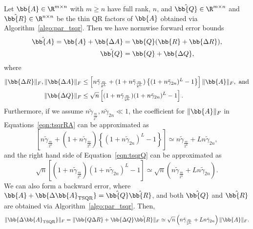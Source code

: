 \begin{theorem}
	\label{thm:moriTSQR}
	Let $\bb{A}\in\R^{m\times n}$ with $m\geq n$ have full rank, $n$, and $\hat{\bb{Q}}\in\R^{m\times n}$ and $\hat{\bb{R}}\in\R^{n\times n}$ be the thin QR factors of $\bb{A}$ obtained via Algorithm~\ref{algo:par_tsqr}. 
	Then we have normwise forward error bounds
	\begin{align*}
	\hat{\bb{A}} = \bb{A} +\bb{\Delta A} &=  \bb{Q}(\bb{R} + \bb{\Delta R}),\\
	\hat{\bb{Q}} &= \bb{Q} + \bb{\Delta Q},
	\end{align*}
	where
	\begin{align}
	\|\bb{\Delta R}\|_F, \|\bb{\Delta A}\|_F &\leq \left[n\tilde{\gamma}_{ \frac{m}{2^L}}+(1+n\tilde{\gamma}_{ \frac{m}{2^L}})\left\{(1+n\tilde{\gamma}_{ 2n})^L-1\right\}\right]\|\bb{A}\|_F, \text{ and} \label{eqn:tsqrRA}\\
	\|\bb{\Delta Q}\|_F &\leq \sqrt{n}\left[(1+n\tilde{\gamma}_{ \frac{m}{2^L}})(1+n\tilde{\gamma}_{ 2n})^L -1\right].\label{eqn:tsqrQ}
	\end{align}
	Furthermore, if we assume $n\tilde{\gamma}_{ \frac{m}{2^L}}, n\tilde{\gamma}_{ 2n} \ll 1$, the coefficient for $\|\bb{A}\|_F$ in Equations~\ref{eqn:tsqrRA} can be approximated as
	\begin{equation}
	\left[n\tilde{\gamma}_{ \frac{m}{2^L}}+(1+n\tilde{\gamma}_{ \frac{m}{2^L}})\left\{(1+n\tilde{\gamma}_{ 2n})^L-1\right\}\right] \simeq n\tilde{\gamma}_{ \frac{m}{2^L}} + Ln\tilde{\gamma}_{ 2n}, %
	\end{equation}
	and the right hand side of Equation~\ref{eqn:tsqrQ} can be approximated as
	\begin{equation}
	 \sqrt{n}\left[(1+n\tilde{\gamma}_{ \frac{m}{2^L}})(1+n\tilde{\gamma}_{ 2n})^L -1\right]\simeq \sqrt{n}\left(n\tilde{\gamma}_{ \frac{m}{2^L}} + Ln\tilde{\gamma}_{ 2n}\right). %
	\end{equation}
	We can also form a backward error, where $\bb{A}+\bb{\Delta \bb{A}_{\text{TSQR}}} = \hat{\bb{Q}}\hat{\bb{R}}$, and both $\hat{\bb{Q}}$ and $\hat{\bb{R}}$ are obtained via Algorithm~\ref{algo:par_tsqr}.
	Then,
	\begin{equation}
	\|\bb{\Delta \bb{A}_{\text{TSQR}}}\|_F =\|\bb{Q \Delta R} + \bb{\Delta Q}\hat{\bb{R}}\|_F \simeq \sqrt{n}\left(n\tilde{\gamma}_{ \frac{m}{2^L}} + Ln\tilde{\gamma}_{ 2n}\right)\|\bb{A}\|_F.
	\end{equation}
\end{theorem}

